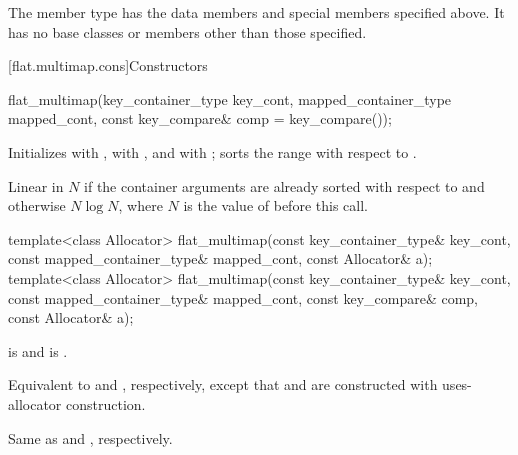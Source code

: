\pnum
The member type  has the data members and special members
specified above. It has no base classes or members other than those
specified.

[flat.multimap.cons]{Constructors}

%
\begin{itemdecl}
flat_multimap(key_container_type key_cont, mapped_container_type mapped_cont,
              const key_compare& comp = key_compare());
\end{itemdecl}

\begin{itemdescr}
\pnum
\effects
Initializes
 with ,
 with , and
 with ;
sorts the range  with respect to .

\pnum
\complexity
Linear in $N$ if the container arguments are already sorted
with respect to  and otherwise $N \log N$,
where $N$ is the value of  before this call.
\end{itemdescr}

%
\begin{itemdecl}
template<class Allocator>
  flat_multimap(const key_container_type& key_cont, const mapped_container_type& mapped_cont,
                const Allocator& a);
template<class Allocator>
  flat_multimap(const key_container_type& key_cont, const mapped_container_type& mapped_cont,
                const key_compare& comp, const Allocator& a);
\end{itemdecl}

\begin{itemdescr}
\pnum
\constraints
{} is  and
 is .

\pnum
\effects
Equivalent to  and
, respectively,
except that  and  are constructed
with uses-allocator construction.

\pnum
\complexity
Same as  and
, respectively.
\end{itemdescr}

